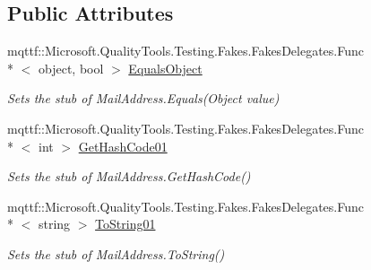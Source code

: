 \subsection*{Public Attributes}
\begin{DoxyCompactItemize}
\item 
mqttf\-::\-Microsoft.\-Quality\-Tools.\-Testing.\-Fakes.\-Fakes\-Delegates.\-Func\\*
$<$ object, bool $>$ \hyperlink{class_system_1_1_net_1_1_mail_1_1_fakes_1_1_stub_mail_address_a5eace72fc49aaab242659c97c2b5ed33}{Equals\-Object}
\begin{DoxyCompactList}\small\item\em Sets the stub of Mail\-Address.\-Equals(\-Object value)\end{DoxyCompactList}\item 
mqttf\-::\-Microsoft.\-Quality\-Tools.\-Testing.\-Fakes.\-Fakes\-Delegates.\-Func\\*
$<$ int $>$ \hyperlink{class_system_1_1_net_1_1_mail_1_1_fakes_1_1_stub_mail_address_a0e030de91be2f79ddb49724753accada}{Get\-Hash\-Code01}
\begin{DoxyCompactList}\small\item\em Sets the stub of Mail\-Address.\-Get\-Hash\-Code()\end{DoxyCompactList}\item 
mqttf\-::\-Microsoft.\-Quality\-Tools.\-Testing.\-Fakes.\-Fakes\-Delegates.\-Func\\*
$<$ string $>$ \hyperlink{class_system_1_1_net_1_1_mail_1_1_fakes_1_1_stub_mail_address_a9eb454138ca8f4c4e61c442f0dc2bd05}{To\-String01}
\begin{DoxyCompactList}\small\item\em Sets the stub of Mail\-Address.\-To\-String()\end{DoxyCompactList}\end{DoxyCompactItemize}
